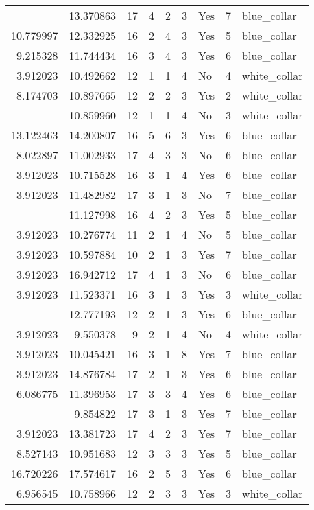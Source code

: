 \documentclass[
]{article}
\begin{document}
\begin{longtable}[t]{rrrrrllrl}
\addlinespace
3.912023 & 13.370863 & 17 & 4 & 2 & 3 & Yes & 7 & blue\_collar\\
10.779997 & 12.332925 & 16 & 2 & 4 & 3 & Yes & 5 & blue\_collar\\
9.215328 & 11.744434 & 16 & 3 & 4 & 3 & Yes & 6 & blue\_collar\\
3.912023 & 10.492662 & 12 & 1 & 1 & 4 & No & 4 & white\_collar\\
8.174703 & 10.897665 & 12 & 2 & 2 & 3 & Yes & 2 & white\_collar\\
\addlinespace
3.912023 & 10.859960 & 12 & 1 & 1 & 4 & No & 3 & white\_collar\\
13.122463 & 14.200807 & 16 & 5 & 6 & 3 & Yes & 6 & blue\_collar\\
8.022897 & 11.002933 & 17 & 4 & 3 & 3 & No & 6 & blue\_collar\\
3.912023 & 10.715528 & 16 & 3 & 1 & 4 & Yes & 6 & blue\_collar\\
3.912023 & 11.482982 & 17 & 3 & 1 & 3 & No & 7 & blue\_collar\\
\addlinespace
12.524708 & 11.127998 & 16 & 4 & 2 & 3 & Yes & 5 & blue\_collar\\
3.912023 & 10.276774 & 11 & 2 & 1 & 4 & No & 5 & blue\_collar\\
3.912023 & 10.597884 & 10 & 2 & 1 & 3 & Yes & 7 & blue\_collar\\
3.912023 & 16.942712 & 17 & 4 & 1 & 3 & No & 6 & blue\_collar\\
3.912023 & 11.523371 & 16 & 3 & 1 & 3 & Yes & 3 & white\_collar\\
\addlinespace
3.912023 & 12.777193 & 12 & 2 & 1 & 3 & Yes & 6 & blue\_collar\\
3.912023 & 9.550378 & 9 & 2 & 1 & 4 & No & 4 & white\_collar\\
3.912023 & 10.045421 & 16 & 3 & 1 & 8 & Yes & 7 & blue\_collar\\
3.912023 & 14.876784 & 17 & 2 & 1 & 3 & Yes & 6 & blue\_collar\\
6.086775 & 11.396953 & 17 & 3 & 3 & 4 & Yes & 6 & blue\_collar\\
\addlinespace
3.912023 & 9.854822 & 17 & 3 & 1 & 3 & Yes & 7 & blue\_collar\\
3.912023 & 13.381723 & 17 & 4 & 2 & 3 & Yes & 7 & blue\_collar\\
8.527143 & 10.951683 & 12 & 3 & 3 & 3 & Yes & 5 & blue\_collar\\
16.720226 & 17.574617 & 16 & 2 & 5 & 3 & Yes & 6 & blue\_collar\\
6.956545 & 10.758966 & 12 & 2 & 3 & 3 & Yes & 3 & white\_collar\\

\end{longtable}
\end{document}
